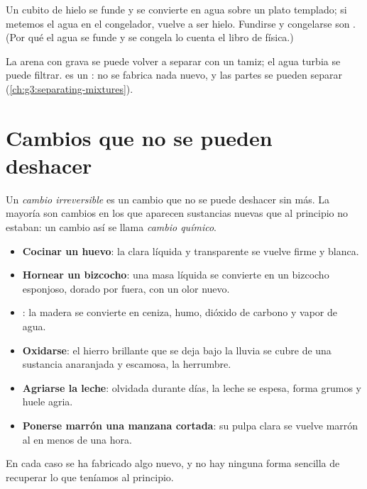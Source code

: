 \begin{example}\label{ex:g5:irreversible-changes:ice}
Un cubito de hielo se funde y se convierte en agua sobre un plato
templado; si metemos el agua en el congelador, vuelve a ser hielo.
Fundirse y congelarse son . (Por qué el agua se
funde y se congela lo cuenta el libro de física.)
\end{example}

\begin{example}[Mezclar]\label{ex:g5:irreversible-changes:mix}
La arena  con grava se puede volver a separar con un tamiz; el
agua turbia se puede filtrar.  es un : no se
fabrica nada nuevo, y las partes se pueden separar
(\cref{ch:g3:separating-mixtures}).
\end{example}

\section{Cambios que no se pueden deshacer}

\begin{definition}\label{def:g5:irreversible-changes:chemical-change}
Un \emph{cambio irreversible} es un cambio
que no se puede deshacer sin más. La mayoría son cambios en los que
aparecen sustancias nuevas que al principio no estaban: un cambio así se
llama \emph{cambio químico}.
\end{definition}

\begin{example}\label{ex:g5:irreversible-changes:six}
\begin{itemize}
  \item \textbf{Cocinar un huevo}: la clara líquida y transparente se
        vuelve firme y blanca.
  \item \textbf{Hornear un bizcocho}: una masa líquida se convierte en
        un bizcocho esponjoso, dorado por fuera, con un olor nuevo.
  \item \textbf{}: la madera se convierte en ceniza, humo, dióxido
        de carbono y vapor de agua.
  \item \textbf{Oxidarse}: el hierro brillante que se deja bajo la
        lluvia se cubre de una sustancia anaranjada y escamosa, la
        herrumbre.
  \item \textbf{Agriarse la leche}: olvidada durante días, la leche se
        espesa, forma grumos y huele agria.
  \item \textbf{Ponerse marrón una manzana cortada}: su pulpa clara se
        vuelve marrón al  en menos de una hora.
\end{itemize}
En cada caso se ha fabricado algo nuevo, y no hay ninguna forma sencilla
de recuperar lo que teníamos al principio.
\end{example}

